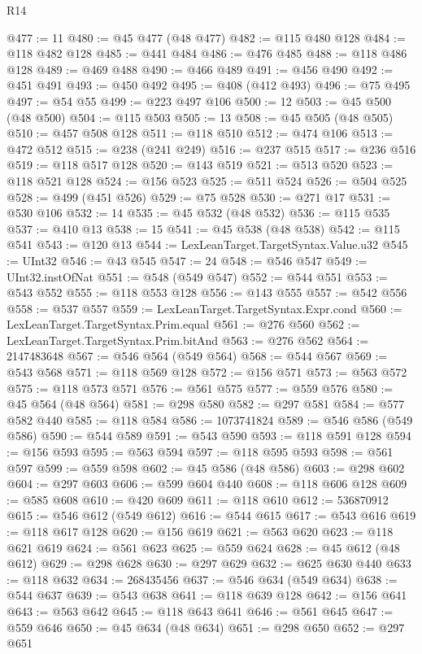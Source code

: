 \begin{lexlean}{R14}
\begin{coremodule}
{{{{{{{{{{{{{{{{{{{{{{{{{{{{{{{{{{{{{{{{{{{{{{{{{{{{{{{{{{{{{{{{{{{{{{{{{{{{{{{{{{@477 := 11
@480 := @45 @477 (@48 @477)
@482 := @115 @480 @128
@484 := @118 @482 @128
@485 := @441 @484
@486 := @476 @485
@488 := @118 @486 @128
@489 := @469 @488
@490 := @466 @489
@491 := @456 @490
@492 := @451 @491
@493 := @450 @492
@495 := @408 (@412 @493)
@496 := @75 @495
@497 := @54 @55
@499 := @223 @497 @106
@500 := 12
@503 := @45 @500 (@48 @500)
@504 := @115 @503
@505 := 13
@508 := @45 @505 (@48 @505)
@510 := @457 @508 @128
@511 := @118 @510
@512 := @474 @106
@513 := @472 @512
@515 := @238 (@241 @249)
@516 := @237 @515
@517 := @236 @516
@519 := @118 @517 @128
@520 := @143 @519
@521 := @513 @520
@523 := @118 @521 @128
@524 := @156 @523
@525 := @511 @524
@526 := @504 @525
@528 := @499 (@451 @526)
@529 := @75 @528
@530 := @271 @17
@531 := @530 @106
@532 := 14
@535 := @45 @532 (@48 @532)
@536 := @115 @535
@537 := @410 @13
@538 := 15
@541 := @45 @538 (@48 @538)
@542 := @115 @541
@543 := @120 @13
@544 := LexLeanTarget.TargetSyntax.Value.u32
@545 := UInt32
@546 := @43 @545
@547 := 24
@548 := @546 @547
@549 := UInt32.instOfNat
@551 := @548 (@549 @547)
@552 := @544 @551
@553 := @543 @552
@555 := @118 @553 @128
@556 := @143 @555
@557 := @542 @556
@558 := @537 @557
@559 := LexLeanTarget.TargetSyntax.Expr.cond
@560 := LexLeanTarget.TargetSyntax.Prim.equal
@561 := @276 @560
@562 := LexLeanTarget.TargetSyntax.Prim.bitAnd
@563 := @276 @562
@564 := 2147483648
@567 := @546 @564 (@549 @564)
@568 := @544 @567
@569 := @543 @568
@571 := @118 @569 @128
@572 := @156 @571
@573 := @563 @572
@575 := @118 @573 @571
@576 := @561 @575
@577 := @559 @576
@580 := @45 @564 (@48 @564)
@581 := @298 @580
@582 := @297 @581
@584 := @577 @582 @440
@585 := @118 @584
@586 := 1073741824
@589 := @546 @586 (@549 @586)
@590 := @544 @589
@591 := @543 @590
@593 := @118 @591 @128
@594 := @156 @593
@595 := @563 @594
@597 := @118 @595 @593
@598 := @561 @597
@599 := @559 @598
@602 := @45 @586 (@48 @586)
@603 := @298 @602
@604 := @297 @603
@606 := @599 @604 @440
@608 := @118 @606 @128
@609 := @585 @608
@610 := @420 @609
@611 := @118 @610
@612 := 536870912
@615 := @546 @612 (@549 @612)
@616 := @544 @615
@617 := @543 @616
@619 := @118 @617 @128
@620 := @156 @619
@621 := @563 @620
@623 := @118 @621 @619
@624 := @561 @623
@625 := @559 @624
@628 := @45 @612 (@48 @612)
@629 := @298 @628
@630 := @297 @629
@632 := @625 @630 @440
@633 := @118 @632
@634 := 268435456
@637 := @546 @634 (@549 @634)
@638 := @544 @637
@639 := @543 @638
@641 := @118 @639 @128
@642 := @156 @641
@643 := @563 @642
@645 := @118 @643 @641
@646 := @561 @645
@647 := @559 @646
@650 := @45 @634 (@48 @634)
@651 := @298 @650
@652 := @297 @651
}}}}}}}}}}}}}}}}}}}}}}}}}}}}}}}}}}}}}}}}}}}}}}}}}}}}}}}}}}}}}}}}}}}}}}}}}}}}}}}}}}
\end{coremodule}
\end{lexlean}
